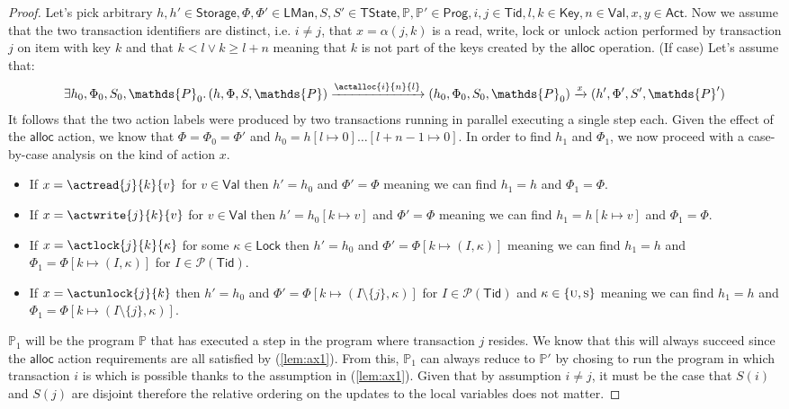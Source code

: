 \begin{proof}
Let's pick arbitrary $h, h' \in \mathsf{Storage}, \Phi, \Phi' \in \mathsf{LMan}, S, S' \in \mathsf{TState}, \mathds{P}, \mathds{P}' \in \mathsf{Prog}, i, j \in \mathsf{Tid}, l, k \in \mathsf{Key}, n \in \mathsf{Val}, x, y \in \mathsf{Act}$. Now we assume that the two transaction identifiers are distinct, i.e. $i \neq j$, that $x = \alpha(j, k)$ is a read, write, lock or unlock action performed by transaction $j$ on item with key $k$ and that $k < l \lor k \geq l + n$ meaning that $k$ is not part of the keys created by the $\mathsf{alloc}$ operation. (If case) Let's assume that:
\begin{gather} \label{lem:ax1}
	\exists h_0, \Phi_0, S_0, \mathds{P}_0 \ldotp 
	(h, \Phi, S, \mathds{P}) \xrightarrow{\actalloc{i}{n}{l}} (h_0, \Phi_0, S_0, \mathds{P}_0)  \xrightarrow{x} (h', \Phi', S', \mathds{P}')
\end{gather}
It follows that the two action labels were produced by two transactions running in parallel executing a single step each. Given the effect of the $\mathsf{alloc}$ action, we know that $\Phi = \Phi_0 = \Phi'$ and $h_0 = h[l \mapsto 0]\ldots[l + n - 1 \mapsto 0]$. In order to find $h_1$ and $\Phi_1$, we now proceed with a case-by-case analysis on the kind of action $x$.
\begin{itemize}
	\item If $x = \actread{j}{k}{v}$ for $v \in \mathsf{Val}$ then $h' = h_0$ and $\Phi' = \Phi$ meaning we can find $h_1 = h$ and $\Phi_1 = \Phi$.
	\item If $x = \actwrite{j}{k}{v}$ for $v \in \mathsf{Val}$ then $h' = h_0[k \mapsto v]$ and $\Phi' = \Phi$ meaning we can find $h_1 = h[k \mapsto v]$ and $\Phi_1 = \Phi$.
	\item If $x = \actlock{j}{k}{\kappa}$ for some $\kappa \in \mathsf{Lock}$ then $h' = h_0$ and $\Phi' = \Phi[k \mapsto (I, \kappa)]$ meaning we can find $h_1 = h$ and $\Phi_1 = \Phi[k \mapsto (I, \kappa)]$ for $I \in \mathcal{P}(\mathsf{Tid})$.
	\item If $x = \actunlock{j}{k}$ then $h' = h_0$ and $\Phi' = \Phi[k \mapsto (I \setminus \{j\}, \kappa)]$ for $I \in \mathcal{P}(\mathsf{Tid})$ and $\kappa \in \{\textsc{u}, \textsc{s}\}$ meaning we can find $h_1 = h$ and $\Phi_1 = \Phi[k \mapsto (I \setminus \{j\}, \kappa)]$.
\end{itemize}
$\mathds{P}_1$ will be the program $\mathds{P}$ that has executed a step in the program where transaction $j$ resides. We know that this will always succeed since the $\mathsf{alloc}$ action requirements are all satisfied by (\ref{lem:ax1}). From this, $\mathds{P}_1$ can always reduce to $\mathds{P}'$ by chosing to run the program in which transaction $i$ is which is possible thanks to the assumption in (\ref{lem:ax1}). Given that by assumption $i \neq j$, it must be the case that $S(i)$ and $S(j)$ are disjoint therefore the relative ordering on the updates to the local variables does not matter.
\end{proof}

